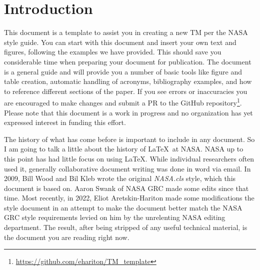 \documentclass[]{NASA}
\begin{document}



\newpage
\section{Introduction} \label{sec:Introduction}
\begin{flushleft} %
\setlength{\parindent}{20pt}

\hspace{\parindent} This document is a template to assist you in creating a new \ac{TM} per the NASA style guide. 
You can start with this document and insert your own text and figures, following the examples we have provided. 
This should save you considerable time when preparing your document for publication. 
The document is a general guide and will provide you a number of basic tools like figure and table creation, automatic handling of acronyms, bibliography examples, and how to reference different sections of the paper. 
If you see errors or inaccuracies you are encouraged to make changes and submit a \ac{PR} to the GitHub repository\footnote{\url{https://github.com/ehariton/TM_template}}. 
Please note that this document is a work in progress and no organization has yet expressed interest in funding this effort. 

The history of what has come before is important to include in any document. So I am going to talk a little about the history of \LaTeX ~at NASA. 
NASA up to this point has had little focus on using \LaTeX. While individual researchers often used it, generally collaborative document writing was done in word via email. 
In 2009, Bill Wood and Bil Kleb wrote the original \emph{NASA.cls} style, which this document is based on. Aaron Swank of NASA GRC made some edits since that time. 
Most recently, in 2022, Eliot Aretskin-Hariton made some modifications the style document in an attempt to make the document better match the NASA GRC style requirements levied on him by the unrelenting NASA editing department. 
The result, after being stripped of any useful technical material, is the document you are reading right now. 


\end{flushleft}
\end{document}
